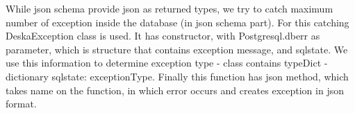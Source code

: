 \documentclass[deska]{subfiles}
\begin{document}
While json schema provide json as returned types, we try to catch maximum number of exception inside the database (in
json schema part).
For this catching DeskaException class is used. It has constructor, with Postgresql.dberr as parameter, which is structure that contains exception
message, and sqlstate. We use this information to determine exception type - class contains typeDict - dictionary {sqlstate: exceptionType}.
Finally this function has json method, which takes name on the function, in which error occurs and creates exception in json format.

\end{document}
